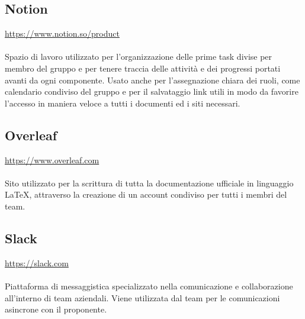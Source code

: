 \documentclass[10pt, a4paper]{article}
\begin{document}
\subsection{Notion}
\href{https://www.notion.so/product}{https://www.notion.so/product}\\\\
Spazio di lavoro utilizzato per l'organizzazione delle prime task divise per membro del gruppo e per tenere traccia delle attività e dei progressi portati avanti da ogni componente. Usato anche per l'assegnazione chiara dei ruoli, come calendario condiviso del gruppo e per il salvataggio link utili in modo da favorire l'accesso in maniera veloce a tutti i documenti ed i siti necessari.

\subsection{Overleaf}
\href{https://www.overleaf.com}{https://www.overleaf.com}\\\\
Sito utilizzato per la scrittura di tutta la documentazione ufficiale in linguaggio LaTeX, attraverso la creazione di un account condiviso per tutti i membri del team.

\subsection{Slack}
\href{https://slack.com}{https://slack.com}\\\\
Piattaforma di messaggistica specializzato nella comunicazione e collaborazione all'interno di team aziendali. Viene utilizzata dal team per le comunicazioni asincrone con il proponente.
\end{document}
